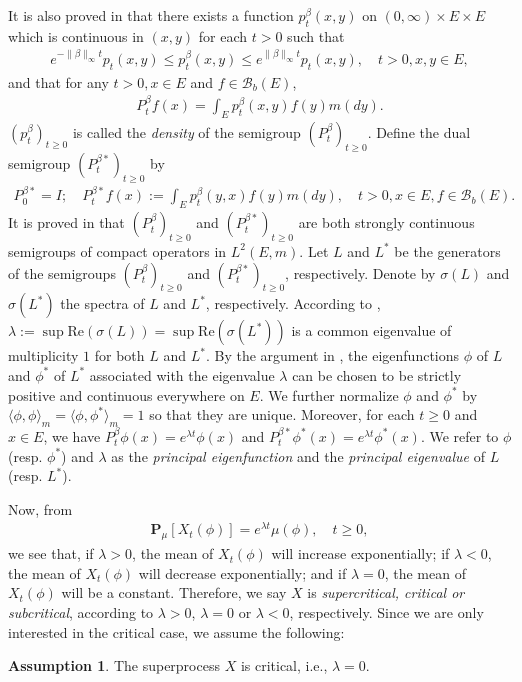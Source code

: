 \documentclass[12pt,a4paper]{amsart}
\theoremstyle{definition}
\newtheorem{asp}{Assumption}
\numberwithin{equation}{section}
\begin{document}
It is also proved in \cite{RenSongZhang2015Limit, RenSongZhang2017Central} 
that there exists a function $p^\beta_t(x,y)$ on $(0,\infty) \times E \times E$ which is continuous in $(x,y)$ for each $t>0$ such that
\begin{align}
	e^{-\|\beta\|_\infty t} p_t(x,y)
	\leq p^{\beta}_t(x,y)
	\leq e^{\|\beta\|_\infty t} p_t(x,y),
	\quad t>0, x, y\in E,
\end{align}
and that for any $t>0, x\in E$ and $f \in \mathscr B_b(E)$,
\begin{align}
	P^\beta_t f(x)
	= \int_E p_t^\beta (x,y) f(y) m(dy).
\end{align}
$(p^\beta_t)_{t\geq 0}$ is called the
\emph{density}  of the semigroup $(P^\beta_t)_{t\geq 0}$.
Define the dual semigroup $(P^{\beta *}_t)_{t \geq 0}$ by
\begin{align}
	P^{\beta *}_0 = I;
	\quad P^{\beta *}_t f(x)
	:= \int_E p^\beta_t (y,x) f(y) m(dy),
	\quad t>0, x\in E, f\in \mathscr B_b(E).
\end{align}
It is proved in \cite{RenSongZhang2015Limit, RenSongZhang2017Central} that $(P^\beta_t)_{t \geq 0}$ and $(P^{\beta *}_t)_{t \geq 0}$ are both strongly continuous semigroups of compact operators in $L^2(E,m)$.
Let $L$ and $L^*$ be the generators of the semigroups $(P^\beta_t)_{t \geq 0}$ and $(P^{\beta *}_t)_{t \geq 0}$, respectively.
Denote by $\sigma(L)$ and $\sigma(L^*)$ the spectra of $L$ and $L^*$, respectively.
According to \cite[Theorem V.6.6]{Schaefer1974Banach}, $\lambda := \sup \text{Re}(\sigma(L)) = \sup \text{Re}(\sigma(L^*))$ is a common eigenvalue of multiplicity $1$ for both $L$ and $L^*$.
By the argument in \cite{RenSongZhang2015Limit}, 
the eigenfunctions $\phi$ of $L$ and $\phi^*$ of $L^*$ associated with the eigenvalue $\lambda$ can be chosen to be strictly positive and continuous everywhere on $E$.
We further normalize $\phi$ and $\phi^*$ by $\langle\phi, \phi\rangle_m = \langle\phi,\phi^*\rangle_m = 1$ so that they are unique.
  Moreover, for each $t\geq 0$ and $x\in E$, we have $P^\beta_t \phi(x) = e^{\lambda t} \phi(x)$ and $P^{\beta *}_t \phi^*(x) = e^{\lambda t} \phi^*(x)$.
We refer to $\phi$ (resp. $\phi^*$) and $\lambda$ as
the \emph{principal eigenfunction} and the \emph{principal eigenvalue} of $L$ (resp. $L^*$).
	
Now, from
\begin{align}
	\mathbf P_\mu[X_t(\phi)]
	= e^{\lambda t} \mu(\phi),
	\quad t \geq 0,
\end{align}
we see that, if $\lambda > 0$, the mean of $X_t(\phi)$ will increase exponentially; if $\lambda < 0$, the mean of $X_t(\phi)$ will decrease exponentially; and if $\lambda = 0$, the mean of $X_t(\phi)$ will be a constant.
Therefore, we say $X$ is \emph{supercritical, critical or subcritical}, according to $\lambda > 0$, $\lambda = 0$ or $\lambda < 0$, respectively.
Since we are only interested in the critical case, we assume the following:
\begin{asp} \label{asp: 2}
  The superprocess $X$ is critical, i.e., $\lambda = 0$.
\end{asp}
\end{document}
